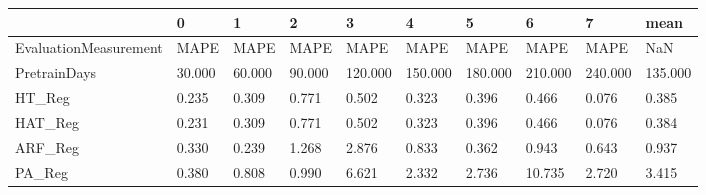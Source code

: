 \begin{tabular}{llllllllll}
\toprule
{} &      0 &      1 &      2 &       3 &       4 &       5 &       6 &       7 &    mean \\
\midrule
EvaluationMeasurement &   MAPE &   MAPE &   MAPE &    MAPE &    MAPE &    MAPE &    MAPE &    MAPE &     NaN \\
PretrainDays          & 30.000 & 60.000 & 90.000 & 120.000 & 150.000 & 180.000 & 210.000 & 240.000 & 135.000 \\
HT\_Reg                &  0.235 &  0.309 &  0.771 &   0.502 &   0.323 &   0.396 &   0.466 &   0.076 &   0.385 \\
HAT\_Reg               &  0.231 &  0.309 &  0.771 &   0.502 &   0.323 &   0.396 &   0.466 &   0.076 &   0.384 \\
ARF\_Reg               &  0.330 &  0.239 &  1.268 &   2.876 &   0.833 &   0.362 &   0.943 &   0.643 &   0.937 \\
PA\_Reg                &  0.380 &  0.808 &  0.990 &   6.621 &   2.332 &   2.736 &  10.735 &   2.720 &   3.415 \\
\bottomrule
\end{tabular}

